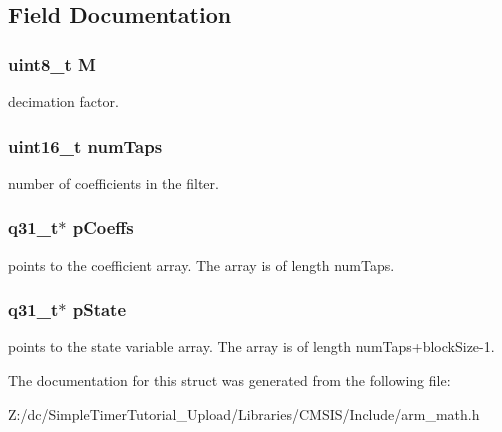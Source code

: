 \subsection{Field Documentation}
\hypertarget{structarm__fir__decimate__instance__q31_ae2c8107d00d3c9942e7a20fc598edecf}{
\subsubsection[{M}]{\setlength{\rightskip}{0pt plus 5cm}uint8\-\_\-t M}}\label{structarm__fir__decimate__instance__q31_ae2c8107d00d3c9942e7a20fc598edecf}
decimation factor. \hypertarget{structarm__fir__decimate__instance__q31_a751941891e47f522a7f5375fe8990aac}{
\subsubsection[{num\-Taps}]{\setlength{\rightskip}{0pt plus 5cm}uint16\-\_\-t num\-Taps}}\label{structarm__fir__decimate__instance__q31_a751941891e47f522a7f5375fe8990aac}
number of coefficients in the filter. \hypertarget{structarm__fir__decimate__instance__q31_a68888e36167d81cb7836db10367a1682}{
\subsubsection[{p\-Coeffs}]{\setlength{\rightskip}{0pt plus 5cm}q31\-\_\-t$\ast$ p\-Coeffs}}\label{structarm__fir__decimate__instance__q31_a68888e36167d81cb7836db10367a1682}
points to the coefficient array. The array is of length num\-Taps. \hypertarget{structarm__fir__decimate__instance__q31_adee4ba3ee8869865af7d8fa08ca913d6}{
\subsubsection[{p\-State}]{\setlength{\rightskip}{0pt plus 5cm}q31\-\_\-t$\ast$ p\-State}}\label{structarm__fir__decimate__instance__q31_adee4ba3ee8869865af7d8fa08ca913d6}
points to the state variable array. The array is of length num\-Taps+block\-Size-\/1. 

The documentation for this struct was generated from the following file\-:\begin{DoxyCompactItemize}
\item 
Z\-:/dc/\-Simple\-Timer\-Tutorial\-\_\-\-Upload/\-Libraries/\-C\-M\-S\-I\-S/\-Include/arm\-\_\-math.\-h\end{DoxyCompactItemize}
